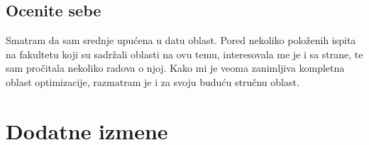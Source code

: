 \documentclass[a4paper]{report}
\begin{document}
\section{Ocenite sebe}

Smatram da sam srednje upućena u datu oblast. Pored nekoliko položenih  ispita na fakultetu koji su sadržali oblasti na ovu temu, interesovala me je i sa strane, te sam pročitala nekoliko radova o njoj. Kako mi je veoma zanimljiva kompletna oblast optimizacije, razmatram je i za svoju buduću stručnu oblast. 





\chapter{Dodatne izmene}
\end{document}
